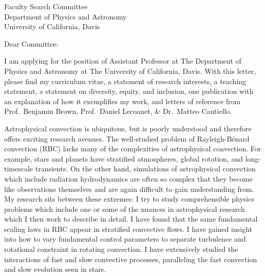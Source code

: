 \documentclass[12pt]{letter}
\begin{document}
\begin{letter}{
               Faculty Search Committee \\
               Department of Physics and Astronomy \\
               University of California, Davis 
           }

\opening{Dear Committee:}

    I am applying for the position of Assistant Professor at The Department of Physics and Astronomy at The University of California, Davis.
    With this letter, please find my curriculum vitae, a statement of research interests, a teaching statement, a statement on diversity, equity, and inclusion, one publication with an explanation of how it exemplifies my work, and letters of reference from Prof.~Benjamin Brown, Prof.~Daniel Lecoanet, \& Dr.~Matteo Cantiello.

    Astrophysical convection is ubiquitous, but is poorly understood and therefore offers exciting research avenues.
    The well-studied problem of Rayleigh-B\'{e}nard convection (RBC) lacks many of the complexities of astrophysical convection.
    For example, stars and planets have stratified atmospheres, global rotation, and long-timescale transients.
    On the other hand, simulations of astrophysical convection which include radiation hydrodynamics are often so complex that they become like observations themselves and are again difficult to gain understanding from.
    My research sits between these extremes: I try to study comprehensible physics problems which include one or some of the nuances in astrophysical research which I then work to describe in detail.
    I have found that the same fundamental scaling laws in RBC appear in stratified convective flows.
    I have gained insight into how to vary fundamental control parameters to separate turbulence and rotational constraint in rotating convection.
    I have extensively studied the interactions of fast and slow convective processes, paralleling the fast convection and slow evolution seen in stars.


\end{letter}
\end{document}
